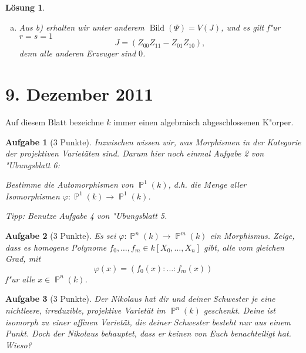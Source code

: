 \documentclass[a4paper, 12pt, numbers=noendperiod, chapterprefix=true]{scrbook}
\theoremstyle{break}
\newtheorem{Aufg}{Aufgabe}
\newtheorem{Loes}{L\"osung}
\theoremstyle{nonumberbreak}
\theoremstyle{nonumberplain}
\DeclareMathOperator{\Bild}{Bild}
\newcommand{\A}{\mathbb{A}}
\DeclareMathOperator{\Projective}{\mathbb{P}} %
\begin{document}
\begin{Loes}
\begin{enumerate}[a)]
	Es sei $z = (z_{00}:\ldots:z_{rs})\in V(J)$. Zun"achst gibt es ein Paar $(i_0,j_0)$, für das $z_{i_0j_0}\neq 0$ gilt. Es ist 
		\[z_{ij}z_{i_0j_0} = z_{i j_0}z_{i_0 j},\]
	was "aquivalent ist zu 
		\[z_{ij} = \frac{z_{ij_0}z_{i_0j}}{z_{i_0j_0}}.\]
	Wir setzen $x_i = z_{ij_0}$ und $y_j=z_{i_0j}$. Dies definiert zwei Punkte $x = (\ldots:x_i:\ldots)\in \Projective^r(K)$ und $y = (\ldots:y_j:\ldots)\in \Projective^s(K)$, und es gilt
		\[\Psi(x,y) = (\ldots:z_{ij_0}z_{i_0j}:\ldots) = (\ldots: \frac{z_{ij_0}z_{i_0j}}{z_{i_0j_0}}:\ldots) = (\ldots:z_{ij}:\ldots).\]
	Somit ist $z\in \Bild(\Psi)$.

\item
	Aus b) erhalten wir unter anderem $\Bild(\Psi) = V(J)$, und es gilt f"ur $r=s=1$
		\[J = (Z_{00}Z_{11}-Z_{01}Z_{10}),\]
	denn alle anderen Erzeuger sind $0$.
\end{enumerate}\end{Loes}

\newpage
\section{9. Dezember 2011}
\setcounter{Aufg}{0}
\setcounter{Loes}{3}

Auf diesem Blatt bezeichne $k$ immer einen algebraisch abgeschlossenen K"orper.

\begin{Aufg}[3 Punkte]
Inzwischen wissen wir, was Morphismen in der Kategorie der projektiven Variet\"aten sind. Darum hier noch einmal Aufgabe 2 von "Ubungsblatt 6:

Bestimme die Automorphismen von $\Projective^1(k)$, d.h. die Menge aller Isomorphismen $\varphi \colon \Projective^1(k) \to \Projective^1(k)$.

\textit{Tipp:} Benutze Aufgabe 4 von "Ubungsblatt 5.
\end{Aufg}

\begin{Aufg}[3 Punkte]
Es sei $\varphi: \Projective^n(k)\to \Projective^m(k)$ ein Morphismus. Zeige, dass es homogene Polynome $f_0,\dots,f_m\in k[X_0,\dots,X_n]$ gibt, alle vom gleichen Grad, mit
	\[\varphi(x) = (f_0(x):\ldots :f_m(x))\]
f"ur alle $x\in \Projective^n(k)$.
\end{Aufg}

\begin{Aufg}[3 Punkte]
Der Nikolaus hat dir und deiner Schwester je eine nichtleere, irreduzible, projektive Variet\"at im $\Projective^n(k)$ geschenkt. Deine ist isomorph zu einer affinen Variet\"at, die deiner Schwester besteht nur aus einem Punkt. Doch der Nikolaus behauptet, dass er keinen von Euch benachteiligt hat. Wieso?
\end{Aufg}
\end{document}

